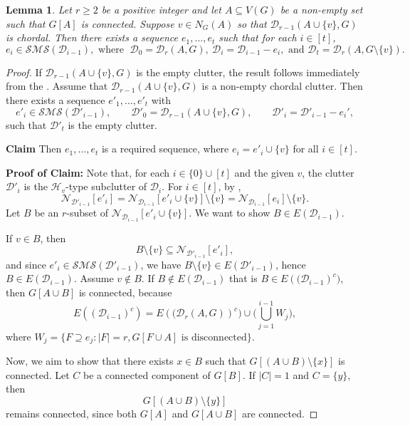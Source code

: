\documentclass[12pt,reqno]{amsart}
\newtheorem{lemma}[proposition]{Lemma}
\theoremstyle{definition}
\def\N{\mathcal{N}}
\def\D{\mathcal{D}}
\def\SMS{\mathcal{SMS}}
\begin{document}
\begin{lemma}\label{chordal 1}
Let $r \ge 2$ be a positive integer and let $A \subseteq V(G)$ be a non-empty set such that $G[A]$ is connected.
Suppose $v \in N_G(A)$ so that $\D_{r-1}(A \cup \{v\}, G)$ is chordal. 
Then there exists a sequence $e_1, \ldots, e_t$ such that for each $i\in[t]$,
\[
e_i \in \SMS(\D_{i-1}), \text{~where~}
\;
\D_0=\D_r(A,G),\ \D_i=\D_{i-1}-e_i, \text{~and~}
\D_t=\D_r(A,G\setminus\{v\}).
\]

\end{lemma}
\begin{proof}
If $\D_{r-1}(A \cup \{v\}, G)$ is the empty clutter, the result follows immediately from the . Assume that $\D_{r-1}(A \cup \{v\}, G)$ is a non-empty chordal clutter. Then there exists a sequence $e'_1, \ldots, e'_t$
with
\[e'_i \in \SMS(\D'_{i-1}), \qquad \D'_0 = \D_{r-1}(A \cup \{v\},G), \qquad\D'_i = \D'_{i-1} - e_i',\] 
such that $\D'_t$ is the empty clutter. 

\medskip
\noindent
\textbf{Claim}
    Then $e_1 , \ldots, e_t $ is a required sequence, where $e_i = e'_i \cup \{v\}$ for all $i \in [t]$.
    
\medskip

\noindent
\textbf{Proof of Claim:}
Note that, for each $i \in \{0\} \cup [t]$ and the given $v$, the clutter $\D'_i$ is the $\mathcal{H}_v$-type subclutter of $\mathcal{D}_i$. 
For $i\in [t]$, by ,
\begin{equation}\label{eq:3}
\N_{\D'_{i-1}}[e'_{i}] = \N_{\D_{i-1}}[e'_{i} \cup \{v\}] \setminus \{v\} = \N_{\D_{i-1}}[e_{i}] \setminus \{v\}.
\end{equation}
Let $B$ be an $r$-subset of $\N_{\D_{i-1}}[e'_{i} \cup \{v\}]$.  
We want to show $B \in E(\D_{i-1})$.

If $v \in B$, then 
\[
B\setminus\{v\} \subseteq \N_{\D'_{i-1}}[e'_{i}],
\]
and since $e'_{i}\in \SMS(\D'_{i-1})$, we have $B\setminus\{v\}\in E(\D'_{i-1})$, hence $B\in E(\D_{i-1})$.
Assume $v \notin B$.
If $B\notin E(\D_{i-1})$ that is $B \in E({(\D_{i-1}})^c)$, then $G[A \cup B]$ is connected, because \[E((\D_{i-1})^c) = E({(\D_r(A,G)})^c) \cup \big(\bigcup\limits_{j=1}^{i-1} W_j \big),\] where $W_j = \{F \supseteq e_j : |F| = r, G[F \cup A] \text{~is disconnected}\}$. 

Now, we aim to show that there exists $x \in B$ such that $G[(A \cup B) \setminus \{x\}]$ is connected. 
Let $C$ be a connected component of $G[B]$.  
If $|C|=1$ and $C=\{y\}$, then
\[
G[(A\cup B)\setminus\{y\}]
\]
remains connected, since both $G[A]$ and $G[A\cup B]$ are connected.


\end{proof}
\end{document}

